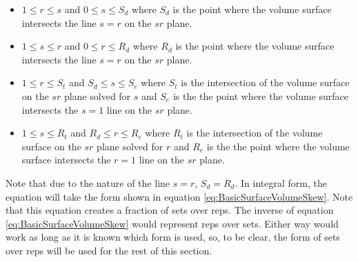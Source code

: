 \begin{itemize}
	\item $1\le r\le s$ and $0\le s \le S_d$ where $S_d$ is the point where the volume surface intersects the line $s=r$ on the $sr$ plane.
	\item $1\le s\le r$ and $0\le r \le R_d$ where $R_d$ is the point where the volume surface intersects the line $s=r$ on the $sr$ plane.
	\item $1\le r\le S_t$ and $S_d \le s\le S_e$ where $S_t$ is the intersection of the volume surface on the $sr$ plane solved for $s$ and $S_e$ is the the point where the volume surface intersects the $s=1$ line on the $sr$ plane.
	\item $1\le s\le R_t$ and $R_d \le r\le R_e$ where $R_t$ is the intersection of the volume surface on the $sr$ plane solved for $r$ and $R_e$ is the the point where the volume surface intersects the $r=1$ line on the $sr$ plane.
\end{itemize}

Note that due to the nature of the line $s=r$, $S_d=R_d$. In integral form, the equation will take the form shown in equation \ref{eq:BasicSurfaceVolumeSkew}. Note that this equation creates a fraction of sets over reps. The inverse of equation \ref{eq:BasicSurfaceVolumeSkew} would represent reps over sets. Either way would work as long as it is known which form is used, so, to be clear, the form of sets over reps will be used for the rest of this section.

